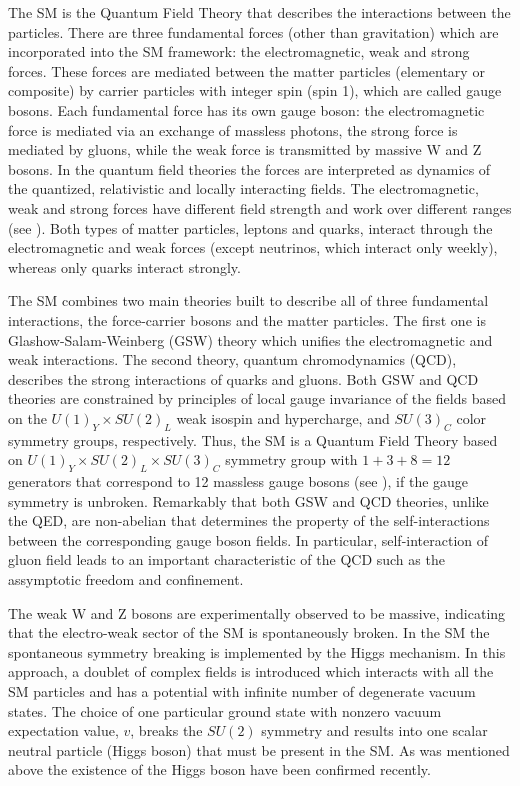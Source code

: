 The SM is the Quantum Field Theory that describes the interactions between the particles.
There are three fundamental forces (other than gravitation) which are incorporated into the SM framework: the electromagnetic, weak and strong forces. These forces are mediated between the matter particles (elementary or composite) by carrier particles with integer spin (spin 1), which are called gauge bosons.
Each fundamental force has its own gauge boson: the electromagnetic force is mediated via an exchange of massless photons, the strong force is mediated by gluons, while the weak force is transmitted by massive W and Z bosons.
In the quantum field theories the forces are interpreted as dynamics of the quantized, relativistic and locally interacting fields.
The electromagnetic, weak and strong forces have different field strength and work over different ranges (see ). 
Both types of matter particles, leptons and quarks, interact through the electromagnetic and weak forces (except neutrinos, which interact only weekly), whereas only quarks interact strongly.

The SM combines two main theories built to describe all of three fundamental interactions, the force-carrier bosons and the matter particles. The first one is Glashow-Salam-Weinberg (GSW) theory which unifies the electromagnetic and weak interactions. The second theory, quantum chromodynamics (QCD), describes the strong interactions of quarks and gluons. Both GSW and QCD theories are constrained by principles of local gauge invariance of the fields based on the $U(1)_Y\times SU(2)_{L}$ weak isospin and hypercharge, and $SU(3)_C$ color symmetry groups, respectively. Thus, the SM is a Quantum Field Theory based on $U(1)_Y\times SU(2)_{L}\times SU(3)_C$ symmetry group with $1+3+8=12$ generators that correspond to 12 massless gauge bosons (see ), if the gauge symmetry is unbroken. Remarkably that both GSW and QCD theories, unlike the QED, are non-abelian that determines the property of the self-interactions between the corresponding gauge boson fields. In particular, self-interaction of gluon field leads to an important characteristic of the QCD such as the assymptotic freedom and confinement.

The weak W and Z bosons are experimentally observed to be massive, indicating that the electro-weak sector of the SM is spontaneously broken. 
In the SM the spontaneous symmetry breaking is implemented by the Higgs mechanism. In this approach,
a doublet of complex fields is introduced which interacts with all the SM particles and has a potential with infinite number of degenerate vacuum states. 
The choice of one particular ground state with nonzero vacuum expectation value, $v$, breaks the $SU(2)$ symmetry and results into one scalar neutral particle (Higgs boson) that must be present in the SM. As was mentioned above the existence of the Higgs boson have been confirmed recently.

